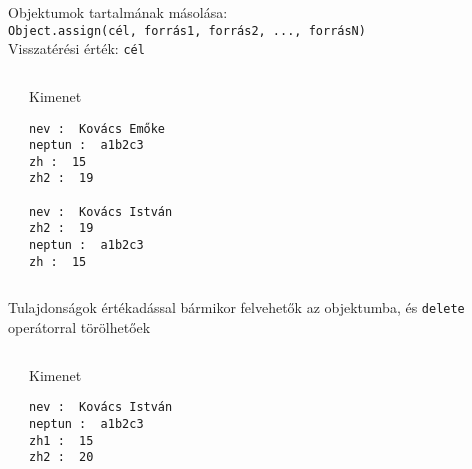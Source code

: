 \begin{frame}
  \small
  \begin{exampleblock}{}
    
  \end{exampleblock}
\end{frame}

\begin{frame}[fragile]
  Objektumok tartalmának másolása: \\
  \qquad \texttt{Object.assign(cél, forrás1, forrás2, ..., forrásN)}\\
  Visszatérési érték: \texttt{cél}
  \footnotesize
  \begin{columns}[T]
      \begin{exampleblock}{}
        
      \end{exampleblock}
      \begin{block}{Kimenet}
        \begin{verbatim}
nev :  Kovács Emőke
neptun :  a1b2c3
zh :  15
zh2 :  19

nev :  Kovács István
zh2 :  19
neptun :  a1b2c3
zh :  15
\end{verbatim}
      \end{block}
  \end{columns}
\end{frame}

\begin{frame}[fragile]
  Tulajdonságok értékadással bármikor felvehetők az objektumba, és \texttt{delete} operátorral törölhetőek
  \vfill
  \footnotesize
  \begin{columns}[T]
      \begin{exampleblock}{}
        
      \end{exampleblock}
      \begin{block}{Kimenet}
        \begin{verbatim}
nev :  Kovács István
neptun :  a1b2c3
zh1 :  15
zh2 :  20
\end{verbatim}
      \end{block}
  \end{columns}
\end{frame}

